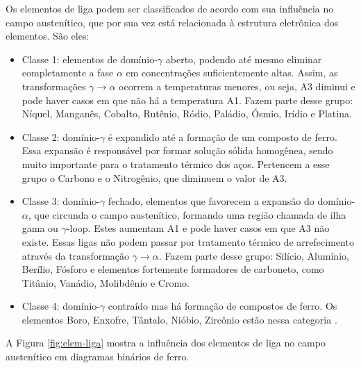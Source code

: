 \documentclass[brazil,tf,epusp]{usp}  %
\begin{document}
Os elementos de liga podem ser classificados de acordo com sua influência no campo austenítico, que por sua vez está relacionada à estrutura eletrônica dos elementos. São eles:
\begin{itemize}
\item Classe 1: elementos de domínio-$\gamma$ aberto, podendo até mesmo eliminar completamente a fase $\alpha$ em concentrações suficientemente altas. Assim, as transformações $\gamma \rightarrow  \alpha$ ocorrem a temperaturas menores, ou seja, A3 diminui e pode haver casos em que não há a temperatura A1. Fazem parte desse grupo: Níquel, Manganês, Cobalto, Rutênio, Ródio, Paládio, Ósmio, Irídio e Platina.

\item Classe 2: domínio-$\gamma$ é expandido até a formação de um composto de ferro. Essa expansão é responsável por formar solução sólida homogênea, sendo muito importante para o tratamento térmico dos aços. Pertencem a esse grupo o Carbono e o Nitrogênio, que diminuem o valor de A3.

\item Classe 3: domínio-$\gamma$ fechado, elementos que favorecem a expansão do domínio-$\alpha$, que circunda o campo austenítico, formando uma região chamada de ilha gama ou $\gamma$-loop. Estes aumentam A1 e pode haver casos em que A3 não existe. Essas ligas não podem passar por tratamento térmico de arrefecimento através da transformação $\gamma \rightarrow \alpha$. Fazem parte desse grupo: Silício, Alumínio, Berílio, Fósforo e elementos fortemente formadores de carboneto, como Titânio, Vanádio, Molibdênio e Cromo.

\item Classe 4: domínio-$\gamma$ contraído mas há formação de compostos de ferro. Os elementos Boro, Enxofre, Tântalo, Nióbio, Zircônio estão nessa categoria \cite{Honeycombe1982} \cite{Silva2010}.
\end{itemize}

A Figura \ref{fig:elem-liga} mostra a influência dos elementos de liga no campo austenítico em diagramas binários de ferro.
\end{document}
